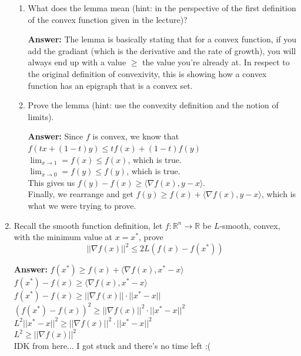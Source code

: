 \documentclass{assignment}
\newcommand{\R}{\mathbb{R}}
\begin{document}
\begin{problem}
\begin{enumerate}
\begin{enumerate}[label=(\alph*)]
        \item What does the lemma mean (hint: in the perspective of the first definition of the convex function given in the lecture)?

        \color{blue}\textbf{Answer:} The lemma is basically stating that for a convex function, if you add the gradiant (which is the derivative and the rate of growth), you will always end up with a value $\geq$ the value you're already at. In respect to the original definition of convexivity, this is showing how a convex function has an epigraph that is a convex set. \color{black}



        \item Prove the lemma (hint: use the convexity definition and the notion of limits).

        \color{blue}\textbf{Answer:} Since $f$ is convex, we know that $f(tx + (1-t)y) \leq tf(x) + (1-t)f(y)$\\
        $\lim_{x\to1} = f(x) \leq f(x)$, which is true.\\
        $\lim_{x\to0} = f(y) \leq f(y)$, which is true.\\
        This gives us $f(y) - f(x) \geq \langle \nabla f(x), y-x \rangle$.\\
        Finally, we rearrange and get $f(y) \geq f(x) + \langle \nabla f(x), y-x \rangle$, which is what we were trying to prove.
        \color{black}


    \end{enumerate}

        
    \item Recall the smooth function definition, let $f : \R^n \rightarrow \R$ be $L$-smooth, convex, with the minimum value at $x = x^*$, prove
    \begin{displaymath}
        ||\nabla f(x)||^2 \leq 2L(f(x) - f(x^*))
        \tag*{(1-2)}
    \end{displaymath}

    \color{blue}\textbf{Answer:} $f(x^*) \geq f(x) + \langle \nabla f(x), x^*-x \rangle$\\
    $f(x^*) - f(x) \geq \langle \nabla f(x), x^*-x \rangle$\\
    $f(x^*) - f(x) \geq ||\nabla f(x)|| \cdot ||x^*-x||$\\
    $(f(x^*) - f(x))^2 \geq ||\nabla f(x)||^2 \cdot ||x^*-x||^2$\\
    $L^2||x^*-x||^2 \geq ||\nabla f(x)||^2 \cdot ||x^*-x||^2$\\
    $L^2 \geq ||\nabla f(x)||^2$\\
    IDK from here... I got stuck and there's no time left :(
    \color{black}


\end{enumerate}
\end{problem}
\end{document}
